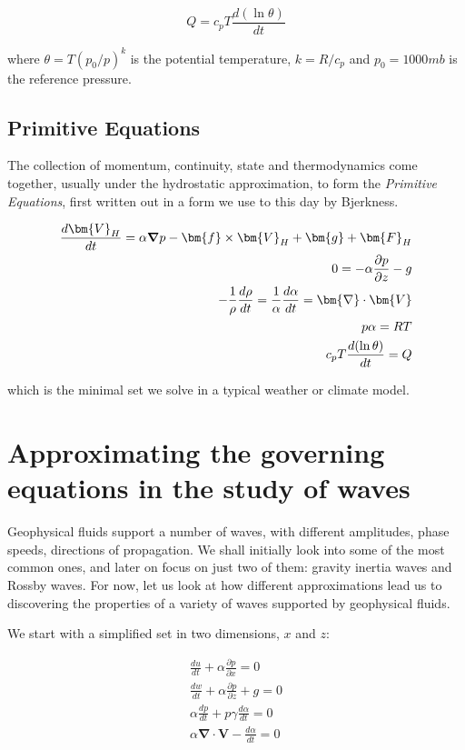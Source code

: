  \begin{equation}
 	Q= c_p T \frac{d(\ln \theta)}{dt}
 \end{equation}

where $\theta = T{(p_0/p)}^k$ is the potential temperature, $k=R/c_p$ and $p_0=1000mb$ is the reference pressure.


\subsection{Primitive Equations}
The collection of momentum, continuity, state and thermodynamics come together, usually under the hydrostatic approximation, to form the \emph{Primitive Equations}, first written out in a form we use to this day by Bjerkness.

\begin{eqnarray}
		\frac{d \bm{V}_H}{dt} = \alpha \grad{p} - \bm{f} \times \bm{V}_H + \bm{g} + \bm{F}_H\\
	0 = -\alpha \frac{\partial p}{\partial z} - g \nonumber \\
	-\frac{1}{\rho} \frac{d \rho}{dt} =   \frac{1}{\alpha} \frac{d \alpha}{dt}     = \bm{\nabla} \cdot  \bm{V} \nonumber \\
	p\alpha=RT \nonumber \\
	c_p T \frac{d(\ln \theta)}{dt} = Q \nonumber
\end{eqnarray}

which is the minimal set we solve in a typical weather or climate model.


\section{Approximating the governing equations in the study of waves}

Geophysical fluids support a number of waves, with different amplitudes, phase speeds, directions of propagation. We shall initially look into some of the most common ones, and later on focus on just two of them: gravity inertia waves and Rossby waves. For now, let us look at how different approximations lead us to discovering the properties of a variety of waves supported by geophysical fluids.

We start with a simplified set in two dimensions, $x$ and $z$:

\begin{eqnarray}
	\frac{d u}{dt} + \alpha \frac{\partial p}{\partial x} = 0\\
		\frac{d w}{dt} + \alpha \frac{\partial p}{\partial z} + g =0 \nonumber \\
	\alpha \frac{d p}{d t} +p \gamma \frac{d \alpha}{dt}  = 0 \nonumber \\
  \alpha \bm{\nabla} \cdot  \bm{V}  -  \frac{d \alpha}{dt}     = 0 \nonumber
\end{eqnarray}

